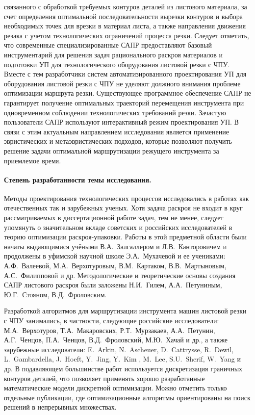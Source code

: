 связанного с обработкой требуемых контуров деталей из листового материала,
за счет определения оптимальной последовательности вырезки контуров
и выбора необходимых точек для врезки в материал листа,
а также направления движения резака
с учетом технологических ограничений процесса резки.
Следует отметить, что современные специализированные САПР предоставляют
базовый инструментарий для решения задач рационального раскроя материалов
и подготовки УП для технологического оборудования листовой резки с ЧПУ.
Вместе с тем разработчики систем автоматизированного проектирования УП
для оборудования листовой резки с ЧПУ не уделяют должного внимания
проблеме оптимизации маршрута резки.
Существующее программное обеспечение САПР не гарантирует
получение оптимальных траекторий перемещения инструмента
при одновременном соблюдении технологических требований резки.
Зачастую пользователи САПР используют интерактивный режим проектирования УП.
В связи с этим актуальным направлением
исследования является применение эвристических и метаэвристических подходов,
которые позволяют получить решение задачи
оптимальной маршрутизации
режущего инструмента
за приемлемое время.

\paragraph*{Степень разработанности темы исследования.}

Методы проектирования технологических процессов
исследовались в работах как отечественных так и зарубежных ученых.
Хотя задача раскроя не входит в круг рассматриваемых в диссертационной работе задач,
тем не менее, следует упомянуть о значительном вкладе советских и российских исследователей
в теорию оптимизации раскроя-упаковки.
Работы в этой предметной области были начаты выдающимися учёными
В.А.~Залгаллером и Л.В.~Канторовичем
и продолжены в уфимской научной школе
Э.А.~Мухачевой и ее учениками:
А.Ф.~Валеевой, М.А.~Верхотуровым, В.М.~Картаком, В.В.~Мартыновым, А.С.~Филипповой и др.
Методологические и теоретические основы создания САПР листового раскроя были заложены
Н.И.~Гилем, А.А.~Петуниным, Ю.Г.~Стояном, В.Д.~Фроловским.

Разработкой алгоритмов для маршрутизации инструмента машин листовой резки с ЧПУ занимались,
в частности, следующие российские исследователи:
М.А.~Верхотуров, Т.А.~Макаровских, Р.Т.~Мурзакаев, А.А.~Петунин, А.Г.~Ченцов,
П.А.~Ченцов, В.Д.~Фроловский, М.Ю.~Хачай и др.,
а также зарубежные исследователи:
E.~Arkin, N.~Ascheuer, D.~Cattrysse, R.~Dewil, L.~Gambardella, J.~Hoeft, Y.~Jing, Y.~Kim , M.~Lee, S.U.~Sherif, W.~Yang и др.
В подавляющем большинстве работ
используется дискретизация граничных контуров деталей,
что позволяет применять хорошо разработанные математические модели дискретной оптимизации.
Можно отметить только отдельные публикации,
где оптимизационные алгоритмы ориентированы на поиск решений в непрерывных множествах.


